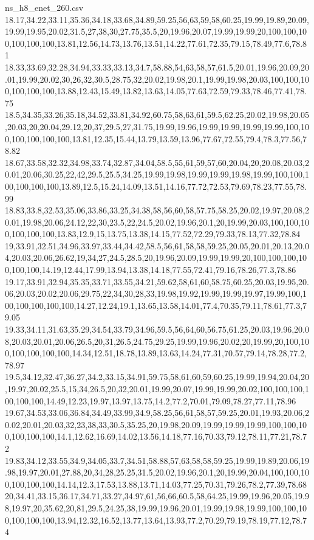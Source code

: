 \begin{filecontents*}[overwrite]{ns_h8_enet_260.csv}
18.17,34.22,33.11,35.36,34.18,33.68,34.89,59.25,56,63,59,58,60.25,19.99,19.89,20.09,19.99,19.95,20.02,31.5,27,38,30,27.75,35.5,20,19.96,20.07,19.99,19.99,20,100,100,100,100,100,100,13.81,12.56,14.73,13.76,13.51,14.22,77.61,72.35,79.15,78.49,77.6,78.81
18.33,33.69,32.28,34.94,33.33,33.13,34.7,58.88,54,63,58,57,61.5,20.01,19.96,20.09,20.01,19.99,20.02,30,26,32,30.5,28.75,32,20.02,19.98,20.1,19.99,19.98,20.03,100,100,100,100,100,100,13.88,12.43,15.49,13.82,13.63,14.05,77.63,72.59,79.33,78.46,77.41,78.75
18.5,34.35,33.26,35.18,34.52,33.81,34.92,60.75,58,63,61,59.5,62.25,20.02,19.98,20.05,20.03,20,20.04,29.12,20,37,29.5,27,31.75,19.99,19.96,19.99,19.99,19.99,19.99,100,100,100,100,100,100,13.81,12.35,15.44,13.79,13.59,13.96,77.67,72.55,79.4,78.3,77.56,78.82
18.67,33.58,32.32,34.98,33.74,32.87,34.04,58.5,55,61,59,57,60,20.04,20,20.08,20.03,20.01,20.06,30.25,22,42,29.5,25.5,34.25,19.99,19.98,19.99,19.99,19.98,19.99,100,100,100,100,100,100,13.89,12.5,15.24,14.09,13.51,14.16,77.72,72.53,79.69,78.23,77.55,78.99
18.83,33.8,32.53,35.06,33.86,33.25,34.38,58,56,60,58,57.75,58.25,20.02,19.97,20.08,20.01,19.98,20.06,24.12,22,30,23.5,22,24.5,20.02,19.96,20.1,20,19.99,20.03,100,100,100,100,100,100,13.83,12.9,15,13.75,13.38,14.15,77.52,72.29,79.33,78.13,77.32,78.84
19,33.91,32.51,34.96,33.97,33.44,34.42,58.5,56,61,58,58,59.25,20.05,20.01,20.13,20.04,20.03,20.06,26.62,19,34,27,24.5,28.5,20,19.96,20.09,19.99,19.99,20,100,100,100,100,100,100,14.19,12.44,17.99,13.94,13.38,14.18,77.55,72.41,79.16,78.26,77.3,78.86
19.17,33.91,32.94,35.35,33.71,33.55,34.21,59.62,58,61,60,58.75,60.25,20.03,19.95,20.06,20.03,20.02,20.06,29.75,22,34,30,28,33,19.98,19.92,19.99,19.99,19.97,19.99,100,100,100,100,100,100,14.27,12.24,19.1,13.65,13.58,14.01,77.4,70.35,79.11,78.61,77.3,79.05
19.33,34.11,31.63,35.29,34.54,33.79,34.96,59.5,56,64,60,56.75,61.25,20.03,19.96,20.08,20.03,20.01,20.06,26.5,20,31,26.5,24.75,29.25,19.99,19.96,20.02,20,19.99,20,100,100,100,100,100,100,14.34,12.51,18.78,13.89,13.63,14.24,77.31,70.57,79.14,78.28,77.2,78.97
19.5,34.12,32.47,36.27,34.2,33.15,34.91,59.75,58,61,60,59,60.25,19.99,19.94,20.04,20,19.97,20.02,25.5,15,34,26.5,20,32,20.01,19.99,20.07,19.99,19.99,20.02,100,100,100,100,100,100,14.49,12.23,19.97,13.97,13.75,14.2,77.2,70.01,79.09,78.27,77.11,78.96
19.67,34.53,33.06,36.84,34.49,33.99,34.9,58.25,56,61,58,57,59.25,20.01,19.93,20.06,20.02,20.01,20.03,32,23,38,33,30.5,35.25,20,19.98,20.09,19.99,19.99,19.99,100,100,100,100,100,100,14.1,12.62,16.69,14.02,13.56,14.18,77.16,70.33,79.12,78.11,77.21,78.72
19.83,34.12,33.55,34.9,34.05,33.7,34.51,58.88,57,63,58,58,59.25,19.99,19.89,20.06,19.98,19.97,20.01,27.88,20,34,28,25.25,31.5,20.02,19.96,20.1,20,19.99,20.04,100,100,100,100,100,100,14.14,12.3,17.53,13.88,13.71,14.03,77.25,70.31,79.26,78.2,77.39,78.68
20,34.41,33.15,36.17,34.71,33.27,34.97,61,56,66,60.5,58,64.25,19.99,19.96,20.05,19.98,19.97,20,35.62,20,81,29.5,24.25,38,19.99,19.96,20.01,19.99,19.98,19.99,100,100,100,100,100,100,13.94,12.32,16.52,13.77,13.64,13.93,77.2,70.29,79.19,78.19,77.12,78.74
\end{filecontents*}

